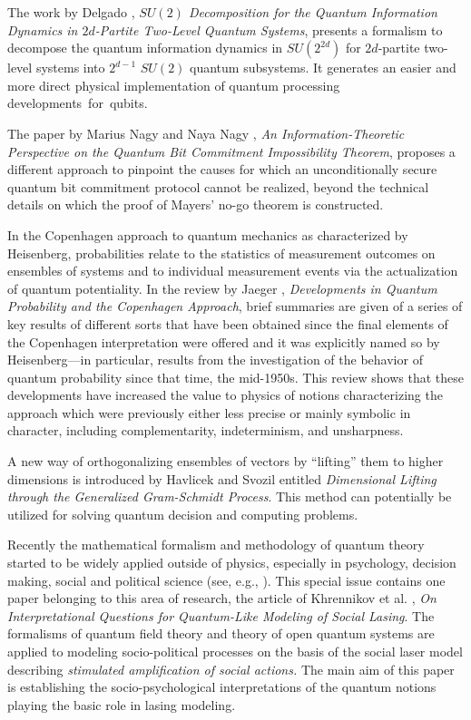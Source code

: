 \documentclass[entropy,editorial,accept,moreauthors,pdftex,10pt,a4paper]{Definitions/mdpi}
\begin{document}
The work by  Delgado \cite{A8},  {\it $SU(2)$ Decomposition for the Quantum Information Dynamics in $2d$-Partite Two-Level Quantum Systems},
presents a formalism to decompose the quantum information dynamics in
$SU(2^{2d})$ for $2d$-partite two-level systems into $2^{d-1}$ $SU(2)$ quantum subsystems.
It generates an easier and more direct physical implementation of quantum processing \mbox{developments for qubits.}

The paper by Marius Nagy and Naya Nagy \cite{A9}, {\it An Information-Theoretic Perspective on the Quantum Bit Commitment Impossibility Theorem},
proposes a different approach to pinpoint the causes for which an unconditionally secure
 quantum bit commitment protocol cannot be realized, beyond the technical details on which the proof of Mayers'  no-go theorem is constructed.

In the Copenhagen approach to quantum mechanics as characterized by Heisenberg, probabilities relate to the statistics of measurement outcomes
on ensembles of systems and to individual measurement events via the actualization of quantum potentiality.
In the review by Jaeger \cite{A10}, {\it  Developments in Quantum Probability and the Copenhagen Approach},
 brief summaries are given of a series of key results of different sorts that have been obtained since the final elements
of the Copenhagen interpretation were offered and it was explicitly named so by Heisenberg---in particular, results from the investigation of the
behavior of quantum probability since that time, the mid-1950s. This review shows that these developments have increased the value to physics of
notions characterizing the approach which
were previously either less precise or mainly symbolic in character, including complementarity, indeterminism, and unsharpness.

A new way of orthogonalizing ensembles of vectors by ``lifting'' them to higher dimensions is introduced by  Havlicek and  Svozil  \cite{A11} entitled
{\it  Dimensional Lifting through the Generalized Gram-Schmidt Process}.
This method can potentially be utilized for solving quantum decision and computing problems.

Recently the mathematical formalism and methodology of quantum theory started to be widely applied outside of physics, especially in psychology, decision making,
social and political science (see, e.g., \cite{UB}).  This special issue contains one paper belonging to this area of research, the article of
Khrennikov et al. \cite{A12},  {\it On Interpretational Questions for Quantum-Like Modeling of Social Lasing}.
The formalisms of quantum field theory and theory of open quantum systems  are applied to modeling socio-political processes on the basis
of the social laser model describing {\it stimulated amplification of social actions.} The main aim of this paper is establishing the socio-psychological interpretations
of the quantum notions playing the basic role in lasing modeling.
\end{document}

